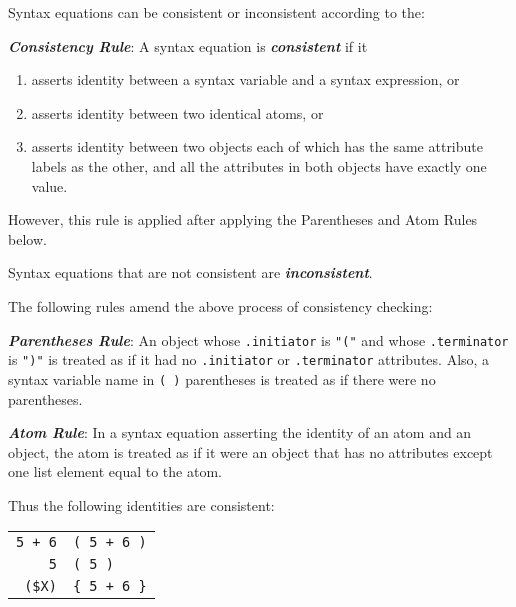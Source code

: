 \documentclass[12pt]{article}
\newcommand{\key}[1]{{\bf \em #1}\index{#1}}
\newcommand{\ikey}[2]{{\bf \em #1}\index{#2}}
\newenvironment{indpar}[1][0.3in]%
	{\begin{list}{}%
		     {\setlength{\itemsep}{0in}%
		      \setlength{\topsep}{0in}%
		      \setlength{\parsep}{1ex}%
		      \setlength{\labelwidth}{#1}%
		      \setlength{\leftmargin}{#1}%
		      \addtolength{\leftmargin}{\labelsep}}%
	 \item}%
	{\end{list}}
\begin{document}
Syntax equations can be consistent or inconsistent according to the:

\begin{indpar}
\begin{list}{}{}
\item[\ikey{Consistency Rule}{consistency rule}:]
A syntax equation is \key{consistent} if it
\begin{enumerate}
\item asserts identity between a syntax variable and a syntax expression, or
\item asserts identity between two identical atoms, or
\item asserts identity between two objects each of which has the same
attribute labels as the other, and all the attributes in both objects
have exactly one value.
\end{enumerate}
However, this rule is applied after applying the Parentheses
and Atom Rules below.

Syntax equations that are not consistent are \key{inconsistent}.
\end{list}
\end{indpar}

The following rules amend the above process of consistency checking:

\begin{indpar}
\begin{list}{}{}
\item[\ikey{Parentheses Rule}{parentheses rule}:]\label{PARENTHESES-RULE}
An object whose {\tt .initiator} is {\tt "("} and whose
{\tt .terminator} is {\tt ")"} is treated as if it had no
{\tt .initiator} or {\tt .terminator} attributes.
Also, a syntax variable name in \verb|( )| parentheses is treated
as if there were no parentheses.

\item[\ikey{Atom Rule}{atom rule}:]\label{ATOM-RULE}
In a syntax equation asserting the identity of an atom and an object,
the atom is treated as if it were an object that has
no attributes except one list element equal to the atom.
\end{list}
\end{indpar}

Thus the following identities are consistent:

\begin{center}
\begin{tabular}{r@{\tt ~:=:~}l}
\verb/5 + 6/ & \verb/( 5 + 6 )/ \\
\verb/5/ & \verb/( 5 )/ \\
\verb/($X)/ & \verb/{ 5 + 6 }/ \\
\end{tabular}
\end{center}
\end{document}
